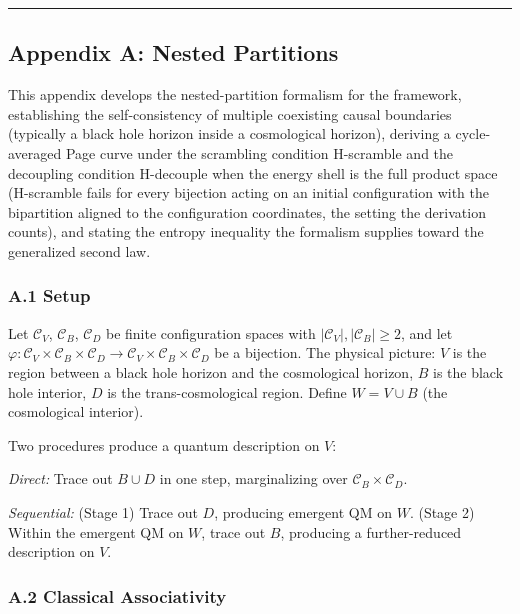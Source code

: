 \documentclass[
]{article}
\begin{document}
\begin{center}\rule{0.5\linewidth}{0.5pt}\end{center}

\hypertarget{appendix-a-nested-partitions}{%
\subsection{Appendix A: Nested
Partitions}\label{appendix-a-nested-partitions}}

This appendix develops the nested-partition formalism for the framework,
establishing the self-consistency of multiple coexisting causal
boundaries (typically a black hole horizon inside a cosmological
horizon), deriving a cycle-averaged Page curve under the scrambling
condition H-scramble and the decoupling condition H-decouple when the
energy shell is the full product space (H-scramble fails for every
bijection acting on an initial configuration with the bipartition
aligned to the configuration coordinates, the setting the derivation
counts), and stating the entropy inequality the formalism supplies
toward the generalized second law.

\hypertarget{a.1-setup}{%
\subsubsection{A.1 Setup}\label{a.1-setup}}

Let \(\mathcal{C}_V\), \(\mathcal{C}_B\), \(\mathcal{C}_D\) be finite
configuration spaces with \(|\mathcal{C}_V|, |\mathcal{C}_B| \geq 2\),
and let
\(\varphi: \mathcal{C}_V \times \mathcal{C}_B \times \mathcal{C}_D \to \mathcal{C}_V \times \mathcal{C}_B \times \mathcal{C}_D\)
be a bijection. The physical picture: \(V\) is the region between a
black hole horizon and the cosmological horizon, \(B\) is the black hole
interior, \(D\) is the trans-cosmological region. Define
\(W = V \cup B\) (the cosmological interior).

Two procedures produce a quantum description on \(V\):

\emph{Direct:} Trace out \(B \cup D\) in one step, marginalizing over
\(\mathcal{C}_B \times \mathcal{C}_D\).

\emph{Sequential:} (Stage 1) Trace out \(D\), producing emergent QM on
\(W\). (Stage 2) Within the emergent QM on \(W\), trace out \(B\),
producing a further-reduced description on \(V\).

\hypertarget{a.2-classical-associativity}{%
\subsubsection{A.2 Classical
Associativity}\label{a.2-classical-associativity}}
\end{document}
